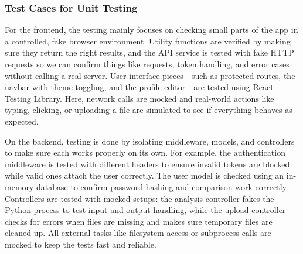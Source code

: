 \subsubsection{Test Cases for Unit Testing}

For the frontend, the testing mainly focuses on checking small parts of the app
in a controlled, fake browser environment. Utility functions are verified by
making sure they return the right results, and the API service is tested with
fake HTTP requests so we can confirm things like requests, token handling, and
error cases without calling a real server. User interface pieces—such as
protected routes, the navbar with theme toggling, and the profile editor—are
tested using React Testing Library. Here, network calls are mocked and
real-world actions like typing, clicking, or uploading a file are simulated to
see if everything behaves as expected.

On the backend, testing is done by isolating middleware, models, and
controllers to make sure each works properly on its own. For example, the
authentication middleware is tested with different headers to ensure invalid
tokens are blocked while valid ones attach the user correctly. The user model
is checked using an in-memory database to confirm password hashing and
comparison work correctly. Controllers are tested with mocked setups: the
analysis controller fakes the Python process to test input and output handling,
while the upload controller checks for errors when files are missing and makes
sure temporary files are cleaned up. All external tasks like filesystem access
or subprocess calls are mocked to keep the tests fast and reliable.

